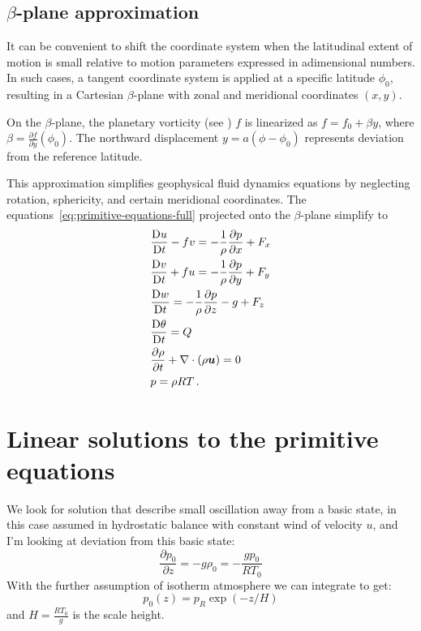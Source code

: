 \subsection{$\beta$-plane approximation}
\label{subsec:beta-plane-primitive}

It can be convenient to shift the coordinate system when the latitudinal extent of motion is small relative to motion parameters expressed in adimensional numbers. In such cases, a tangent coordinate system is applied at a specific latitude \(\phi_0\), resulting in a Cartesian \(\beta\)-plane with zonal and meridional coordinates \((x, y)\).

On the \(\beta\)-plane, the planetary vorticity (see \eq{\ref{}}) \(f\) is linearized as \(f = f_0 + \beta y\), where \(\beta = \frac{\partial f}{\partial y}(\phi_0)\). The northward displacement \(y = a(\phi - \phi_0)\) represents deviation from the reference latitude.

This approximation simplifies geophysical fluid dynamics equations by neglecting rotation, sphericity, and certain meridional coordinates.
The equations~\ref{eq:primitive-equations-full} projected onto the \(\beta\)-plane simplify to
\begin{align}
	 & \frac{\mathrm{D} u}{\mathrm{D}t} - f v  = -\frac{1}{\rho}\frac{\partial p}{\partial x}   + F_x \\
	 & \frac{\mathrm{D} v}{\mathrm{D}t} + f u = -\frac{1}{\rho}\frac{\partial p}{\partial y}  + F_y   \\
	 & \frac{\mathrm{D} w}{\mathrm{D}t}  = -\frac{1}{\rho }\frac{\partial p}{\partial z} -g  + F_z    \\
	 & \frac{\mathrm{D} \theta}{\mathrm{D}t} = Q                                                      \\
	 & \frac{\partial \rho}{\partial t}+\nabla\cdot(\rho\bm{u}) = 0                \\
	 & p = \rho R T \, .
\end{align}


\section{Linear solutions to the primitive equations}\label{sec:linear-solutions}
We look for solution that describe small oscillation away from a basic state, in this case assumed in hydrostatic balance with constant wind of velocity $u$, and I'm looking at deviation from this basic state:
\begin{equation}
	\frac{\partial p_0}{\partial z}=-g\rho_0=-\frac{gp_0}{RT_0}
\end{equation}
With the further assumption of isotherm atmosphere we can integrate to get:
\begin{equation}
	p_0(z)=p_R \exp{(-z/H)}
\end{equation}
and $H=\frac{RT_0}{g}$ is the scale height.


